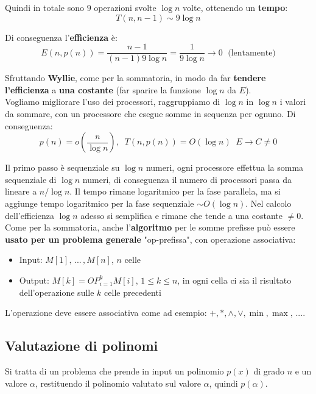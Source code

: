 Quindi in totale sono $9$ operazioni svolte $\log n$ volte, ottenendo un \textbf{tempo}: 
$$ T(n,n-1) \sim 9 \log n $$

Di conseguenza l'\textbf{efficienza} è:
$$ E(n, p(n)) = \frac{n-1}{(n-1) 9 \log n} = \frac{1}{9 \log n} \rightarrow 0 \; \text{ (lentamente)} $$

\newpage

Sfruttando \textbf{Wyllie}, come per la sommatoria, in modo da far \textbf{tendere l'efficienza} a \textbf{una costante} (far sparire la funzione $\log n$ da $E$).\\

Vogliamo migliorare l'uso dei processori, raggruppiamo di $\log n$ in $\log n$ i valori da sommare, con un processore che esegue somme in sequenza per ognuno. Di conseguenza: 
$$ p(n) = o \left(\frac{n}{\log n}\right), \;\; T(n, p(n)) = O (\log n) \;\; E \rightarrow C \neq 0 $$

Il primo passo è sequenziale su $\log n$ numeri, ogni processore effettua la somma sequenziale di $\log n$ numeri, di conseguenza il numero di processori passa da lineare a $n/\log n$. Il tempo rimane logaritmico per la fase parallela, ma si aggiunge tempo logaritmico per la fase sequenziale $\sim O (\log n)$. Nel calcolo dell'efficienza $\log n$ adesso si semplifica e rimane che tende a una costante $\neq 0$.\\

Come per la sommatoria, anche l'\textbf{algoritmo} per le somme prefisse può essere \textbf{usato per un problema generale} "op-prefissa", con operazione associativa:
\begin{itemize}
	\item Input: $M[1], \, ... \, , M[n]$, $n$ celle
	\item Output: $M[k] = OP_{i = 1}^k M[i]$, $1 \leq k \leq n$, in ogni cella ci sia il risultato dell'operazione sulle $k$ celle precedenti 
\end{itemize}

L'operazione deve essere associativa come ad esempio: $+, *, \wedge, \vee, \min, \max, \, ...$.\\

\newpage

\subsection{Valutazione di polinomi}
Si tratta di un problema che prende in input un polinomio $p(x)$ di grado $n$ e un valore $\alpha$, restituendo il polinomio valutato sul valore $\alpha$, quindi $p(\alpha)$.\\

